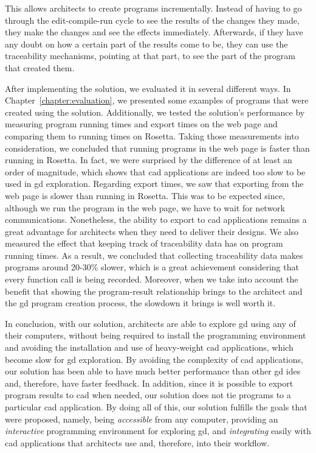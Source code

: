This allows architects to create programs incrementally.
Instead of having to go through the edit-compile-run cycle to see the results of the changes they made, they make the changes and see the effects immediately.
Afterwards, if they have any doubt on how a certain part of the results come to be, they can use the traceability mechanisms, pointing at that part, to see the part of the program that created them.

After implementing the solution, we evaluated it in several different ways.
In Chapter~\ref{chapter:evaluation}, we presented some examples of programs that were created using the solution.
Additionally, we tested the solution's performance by measuring program running times and export times on the web page and comparing them to running times on Rosetta.
Taking those measurements into consideration, we concluded that running programs in the web page is faster than running in Rosetta.
In fact, we were surprised by the difference of at least an order of magnitude, which shows that \gls{cad} applications are indeed too slow to be used in \gls{gd} exploration.
Regarding export times, we saw that exporting from the web page is slower than running in Rosetta.
This was to be expected since, although we run the program in the web page, we have to wait for network communications.
Nonetheless, the ability to export to \gls{cad} applications remains a great advantage for architects when they need to deliver their designs.
We also measured the effect that keeping track of traceability data has on program running times.
As a result, we concluded that collecting traceability data makes programs around 20-30\% slower, which is a great achievement considering that every function call is being recorded.
Moreover, when we take into account the benefit that showing the program-result relationship brings to the architect and the \gls{gd} program creation process, the slowdown it brings is well worth it.

In conclusion, with our solution, architects are able to explore \gls{gd} using any of their computers, without being required to install the programming environment and avoiding the installation and use of heavy-weight \gls{cad} applications, which become slow for \gls{gd} exploration.
By avoiding the complexity of \gls{cad} applications, our solution has been able to have much better performance than other \gls{gd} \glspl{ide} and, therefore, have faster feedback.
In addition, since it is possible to export program results to \gls{cad} when needed, our solution does not tie programs to a particular \gls{cad} application.
By doing all of this, our solution fulfills the goals that were proposed, namely, being \textit{accessible} from any computer, providing an \textit{interactive} programming environment for exploring \gls{gd}, and \textit{integrating} easily with \gls{cad} applications that architects use and, therefore, into their workflow.

